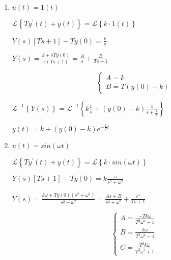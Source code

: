 \documentclass{article}
\begin{document}
\begin{enumerate}[label=\alph*)]
    \item $u\left(t\right)=1 \left(t\right)$ 
    
    \begin{flushleft}
        
        $ \mathcal{L}\left\{T y^{\prime}\left(t\right) + y\left(t\right) \right\}= \mathcal{L}\left\{k \cdot1\left(t\right)\right\} $

        $ Y\left(s\right)\left[Ts+1\right]-Ty\left(0\right) = \frac{k}{s} $

        $ Y\left(s\right) = \frac{k+sTy\left(0\right)}{s\left(Ts+1\right)} = \frac{A}{s} + \frac{B}{Ts+1} $

        \[\begin{cases}
            A=k
            \\
            B=T\left(y\left(0\right)-k\right)
        \end{cases}\]

        $  \mathcal{L}^{-1}\left\{Y\left(s\right)\right\} =  \mathcal{L}^{-1}\left\{k\frac{1}{s}+\left(y\left(0\right)-k\right)\frac{1}{s+\frac{1}{T}}\right\} $

        $ y\left(t\right)=k+\left(y\left(0\right)-k\right)e^{-\frac{1}{T}t} $

    \end{flushleft}

    \newpage



    \item $u\left(t\right)=sin\left(\omega t\right)$ 
    \begin{flushleft}
        
        $ \mathcal{L}\left\{T y^{\prime}\left(t\right) + y\left(t\right) \right\}= \mathcal{L}\left\{k\cdot sin\left(\omega t\right)\right\} $
        
        $ Y\left(s\right)\left[Ts+1\right]-Ty\left(0\right) = k\frac{\omega}{s^{2}+\omega^{2}} $
        
        $ Y\left(s\right) = \frac{k\omega + Ty\left(0\right)\left(s^{2}+\omega^{2}\right)}{s^{2}+\omega^{2}} = \frac{As+B}{s^{2}+\omega^{2}}+\frac{C}{Ts+1}$
        
        \[\begin{cases}
            A=\frac{-Tk\omega}{T^{2}\omega^{2}+1}
            \\
            B=\frac{k\omega}{T^{2}\omega^{2}+1}
            \\
            C=\frac{T^{2}k\omega}{T^{2}\omega^{2}+1}
        \end{cases}\]
        

\end{flushleft}
\end{enumerate}
\end{document}
